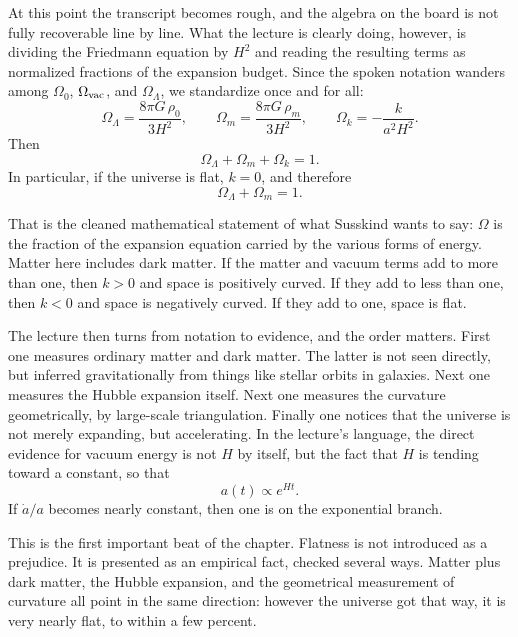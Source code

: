 At this point the transcript becomes rough, and the algebra on the board is not fully recoverable line by line. What the lecture is clearly doing, however, is dividing the Friedmann equation by \(H^2\) and reading the resulting terms as normalized fractions of the expansion budget. Since the spoken notation wanders among \(\Omega_0\), \(\Omega_{\rm vac}\), and \(\Omega_\Lambda\), we standardize once and for all:
\begin{equation}
\Omega_\Lambda=\frac{8\pi G\,\rho_0}{3H^2},
\qquad
\Omega_m=\frac{8\pi G\,\rho_m}{3H^2},
\qquad
\Omega_k=-\frac{k}{a^2H^2}.
\end{equation}
Then
\begin{equation}
\Omega_\Lambda+\Omega_m+\Omega_k=1.
\end{equation}
In particular, if the universe is flat, \(k=0\), and therefore
\begin{equation}
\Omega_\Lambda+\Omega_m=1.
\end{equation}

That is the cleaned mathematical statement of what Susskind wants to say: \(\Omega\) is the fraction of the expansion equation carried by the various forms of energy. Matter here includes dark matter. If the matter and vacuum terms add to more than one, then \(k>0\) and space is positively curved. If they add to less than one, then \(k<0\) and space is negatively curved. If they add to one, space is flat.

The lecture then turns from notation to evidence, and the order matters. First one measures ordinary matter and dark matter. The latter is not seen directly, but inferred gravitationally from things like stellar orbits in galaxies. Next one measures the Hubble expansion itself. Next one measures the curvature geometrically, by large-scale triangulation. Finally one notices that the universe is not merely expanding, but accelerating. In the lecture's language, the direct evidence for vacuum energy is not \(H\) by itself, but the fact that \(H\) is tending toward a constant, so that
\begin{equation}
a(t)\propto e^{Ht}.
\end{equation}
If \(\dot a/a\) becomes nearly constant, then one is on the exponential branch.

This is the first important beat of the chapter. Flatness is not introduced as a prejudice. It is presented as an empirical fact, checked several ways. Matter plus dark matter, the Hubble expansion, and the geometrical measurement of curvature all point in the same direction: however the universe got that way, it is very nearly flat, to within a few percent.

